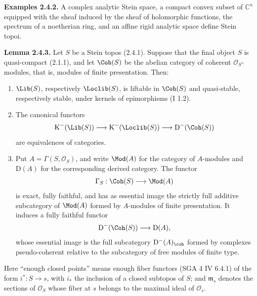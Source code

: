 \documentclass[11pt]{article}
\begin{document}
\textbf{Examples 2.4.2.} A complex analytic Stein space, a compact convex subset of $\mathbb C^n$ equipped with the sheaf induced by the sheaf of holomorphic functions, the spectrum of a noetherian ring, and an affine rigid analytic space define Stein topoi.

\textbf{Lemma 2.4.3.} Let $S$ be a Stein topos (2.4.1). Suppose that the final object $S$ is quasi-compact (2.1.1), and let $\Coh(S)$ be the abelian category of coherent $\mathcal O_S$-modules, that is, modules of finite presentation. Then:
\begin{enumerate}[label=\alph*)]
\item $\Lib(S)$, respectively $\Loclib(S)$, is liftable in $\Coh(S)$ and quasi-stable, respectively stable, under kernels of epimorphisms (I 1.2).
\item The canonical functors
\[
\mathrm K^{-}(\Lib(S))\longrightarrow \mathrm K^{-}(\Loclib(S))\longrightarrow \mathrm D^{-}(\Coh(S))
\]
are equivalences of categories.
\item Put $A=\Gamma(S,\mathcal O_S)$, and write $\Mod(A)$ for the category of $A$-modules and $\mathrm D(A)$ for the corresponding derived category. The functor
\[
\Gamma_S:\Coh(S)\longrightarrow\Mod(A)
\]
is exact, fully faithful, and has as essential image the strictly full additive subcategory of $\Mod(A)$ formed by $A$-modules of finite presentation. It induces a fully faithful functor
\[
\mathrm D^{-}(\Coh(S))\longrightarrow\mathrm D(A),
\]
whose essential image is the full subcategory $\mathrm D^{-}(A)_{\coh}$ formed by complexes pseudo-coherent relative to the subcategory of free modules of finite type.
\end{enumerate}
Here ``enough closed points'' means enough fiber functors (SGA 4 IV 6.4.1) of the form $i^*:S\to s$, with $i_*$ the inclusion of a closed subtopos of $S$; and $\mathfrak m_s$ denotes the sections of $\mathcal O_S$ whose fiber at $s$ belongs to the maximal ideal of $\mathcal O_s$.
\end{document}
